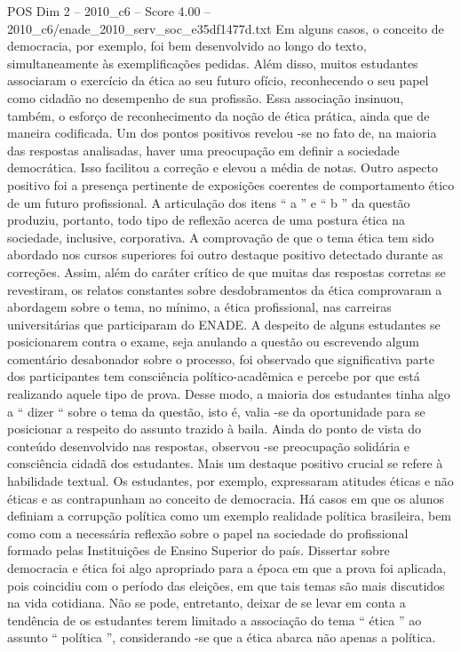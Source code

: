 \begin{textsample}{POS Dim 2 – 2010\_c6 – Score 4.00 – 2010\_c6/enade\_2010\_serv\_soc\_e35df1477d.txt}
Em alguns casos, o conceito de democracia, por exemplo, foi bem desenvolvido ao longo do texto, simultaneamente às exemplificações pedidas.
Além disso, muitos estudantes associaram o exercício da ética ao seu futuro ofício, reconhecendo o seu papel como cidadão no desempenho de sua profissão.
Essa associação insinuou, também, o esforço de reconhecimento da noção de ética prática, ainda que de maneira codificada.
Um dos pontos positivos revelou -se no fato de, na maioria das respostas analisadas, haver uma preocupação em definir a sociedade democrática.
Isso facilitou a correção e elevou a média de notas.
Outro aspecto positivo foi a presença pertinente de exposições coerentes de comportamento ético de um futuro profissional.
A articulação dos itens “ a ” e “ b ” da questão produziu, portanto, todo tipo de reflexão acerca de uma postura ética na sociedade, inclusive, corporativa.
A comprovação de que o tema ética tem sido abordado nos cursos superiores foi outro destaque positivo detectado durante as correções.
Assim, além do caráter crítico de que muitas das respostas corretas se revestiram, os relatos constantes sobre desdobramentos da ética comprovaram a abordagem sobre o tema, no mínimo, a ética profissional, nas carreiras universitárias que participaram do ENADE.
A despeito de alguns estudantes se posicionarem contra o exame, seja anulando a questão ou escrevendo algum comentário desabonador sobre o processo, foi observado que significativa parte dos participantes tem consciência político-acadêmica e percebe por que está realizando aquele tipo de prova.
Desse modo, a maioria dos estudantes tinha algo a “ dizer “ sobre o tema da questão, isto é, valia -se da oportunidade para se posicionar a respeito do assunto trazido à baila.
Ainda do ponto de vista do conteúdo desenvolvido nas respostas, observou -se preocupação solidária e consciência cidadã dos estudantes.
Mais um destaque positivo crucial se refere à habilidade textual.
Os estudantes, por exemplo, expressaram atitudes éticas e não éticas e as contrapunham ao conceito de democracia.
Há casos em que os alunos definiam a corrupção política como um exemplo realidade política brasileira, bem como com a necessária reflexão sobre o papel na sociedade do profissional formado pelas Instituições de Ensino Superior do país.
Dissertar sobre democracia e ética foi algo apropriado para a época em que a prova foi aplicada, pois coincidiu com o período das eleições, em que tais temas são mais discutidos na vida cotidiana.
Não se pode, entretanto, deixar de se levar em conta a tendência de os estudantes terem limitado a associação do tema “ ética ” ao assunto “ política ”, considerando -se que a ética abarca não apenas a política.

\end{textsample}

